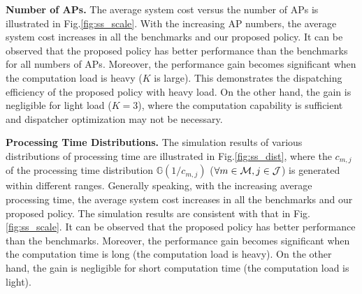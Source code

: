 \textbf{Number of APs.} %
The average system cost versus the number of APs is illustrated in Fig.\ref{fig:ss_scale}.
With the increasing AP numbers, the average system cost increases in all the benchmarks and our proposed policy.
It can be observed that the proposed policy has better performance than the benchmarks for all numbers of APs.
Moreover, the performance gain becomes significant when the computation load is heavy ($K$ is large).
This demonstrates the dispatching efficiency of the proposed policy with heavy load.
On the other hand, the gain is negligible for light load ($K=3$), where the computation capability is sufficient and dispatcher optimization may not be necessary.

\textbf{Processing Time Distributions.}
The simulation results of various distributions of processing time are illustrated in Fig.\ref{fig:ss_dist}, where the $c_{m,j}$ of the processing time distribution $\mathbb{G}(1/c_{m,j})$ ($\forall m\in\mathcal{M},j\in\mathcal{J}$) is generated within different ranges.
Generally speaking, with the increasing average processing time, the average system cost increases in all the benchmarks and our proposed policy.
The simulation results are consistent with that in Fig.\ref{fig:ss_scale}.
It can be observed that the proposed policy has better performance than the benchmarks.
Moreover, the performance gain becomes significant when the computation time is long (the computation load is heavy).
On the other hand, the gain is negligible for short computation time (the computation load is light).

